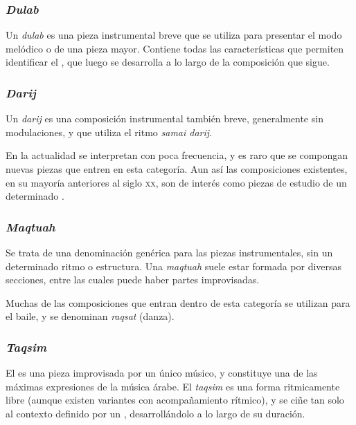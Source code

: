     \subsubsection{\emph{Dulab}}

        Un \emph{dulab} es una pieza instrumental breve que se utiliza para presentar el modo melódico o \maqam de una pieza mayor. Contiene todas las características que permiten identificar el \maqamb, que luego se desarrolla a lo largo de la composición que sigue.


    \subsubsection{\emph{Darij}}

        Un \emph{darij} es una composición instrumental también breve, generalmente sin modulaciones, y que utiliza el ritmo \emph{samai darij}.

        En la actualidad se interpretan con poca frecuencia, y es raro que se compongan nuevas piezas que entren en esta categoría. Aun así las composiciones existentes, en su mayoría anteriores al siglo \textsc{xx}, son de interés como piezas de estudio de un determinado \maqamb.


    \subsubsection{\emph{Maqtuah}}

        Se trata de una denominación genérica para las piezas instrumentales, sin un determinado ritmo o estructura. Una \emph{maqtuah} suele estar formada por diversas secciones, entre las cuales puede haber partes improvisadas.

        Muchas de las composiciones que entran dentro de esta categoría se utilizan para el baile, y se denominan \emph{raqsat} (danza).


    \subsubsection{\emph{Taqsim}}

        El \taqsim es una pieza improvisada por un único músico, y constituye una de las máximas expresiones de la música árabe. El \emph{taqsim} es una forma ritmicamente libre (aunque existen variantes con acompañamiento rítmico), y se ciñe tan solo al contexto definido por un \maqam, desarrollándolo a lo largo de su duración.

